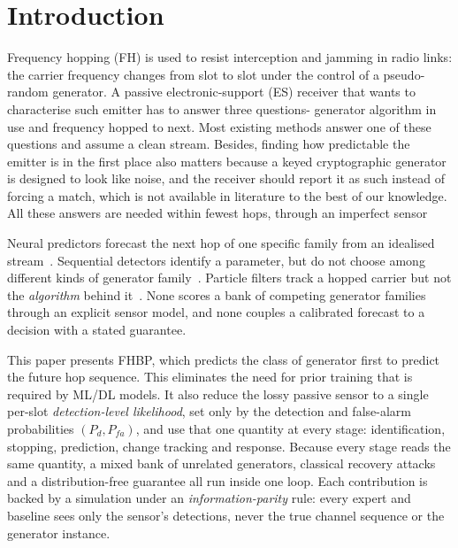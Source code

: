\documentclass[conference]{IEEEtran}
\begin{document}
\section{Introduction}
Frequency hopping (FH) is used to  resist interception
and jamming in radio links: the carrier frequency changes from slot to slot under the control
of a pseudo-random generator. A passive electronic-support (ES) receiver that
wants to characterise such emitter has to answer three questions- generator algorithm in use and frequency hopped to next. Most existing methods answer one of these questions and assume a clean stream. Besides, finding how predictable the emitter is in the first place also matters
because a keyed cryptographic generator is designed to look like noise, and the
receiver should report it as such instead of forcing a match, which is not available in literature to the best of our knowledge. All these answers
are needed within fewest hops, through an imperfect sensor


Neural predictors forecast the next hop of one specific family from an
idealised stream~\cite{li2020lstm,li2021china,zhu2023recovery,basak2024spectrum}.
Sequential detectors identify a parameter, but do not choose among different
kinds of generator family~\cite{baum1994,dragalin1999}. Particle filters track
a hopped carrier but not the \emph{algorithm} behind
it~\cite{valyrakis2009,sidiropoulos2006}. None scores a bank of competing
generator families through an explicit sensor model, and none couples a
calibrated forecast to a decision with a stated guarantee.

This paper presents FHBP, which predicts the class of generator first to predict the future hop sequence. This eliminates the need for prior training that is required by ML/DL models. It also reduce the lossy passive sensor to a single per-slot
\emph{detection-level likelihood}, set only by the detection and false-alarm
probabilities $(P_d,P_{fa})$, and use that one quantity at every stage:
identification, stopping, prediction, change tracking and response. Because
every stage reads the same quantity, a mixed bank of unrelated generators,
classical recovery attacks and a distribution-free guarantee all run inside one
loop. Each contribution is backed by a simulation under an \emph{information-parity}
rule: every expert and baseline sees only the sensor's detections, never the
true channel sequence or the generator instance.
\end{document}
